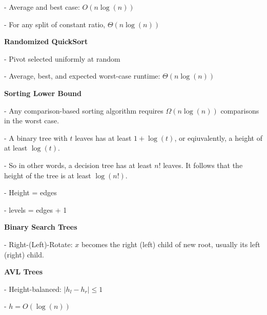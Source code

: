 \documentclass[8pt, letterpaper]{extarticle}
\begin{document}
\begin{minipage}[t]{0.45\textwidth}
- Average and best case: $O(n\log(n))$

- For any split of constant ratio, $\Theta(n\log(n))$

{\small \textbf{Randomized QuickSort}}

- Pivot selected uniformly at random

- Average, best, and expected worst-case runtime: $\Theta(n\log(n))$

\textbf{Sorting Lower Bound}

- Any comparison-based sorting algorithm requires $\Omega(n\log(n))$ comparisons in the worst case.

- A binary tree with $t$ leaves has at least $1 + \log(t)$, or eqiuvalently, a height of at least $\log(t)$.

- So in other words, a decision tree has at least $n!$ leaves. It follows that the height of the tree is at least $\log(n!)$.

- Height = edges

- levels = edges + 1

\textbf{Binary Search Trees}

- Right-(Left)-Rotate: $x$ becomes the right (left) child of new root, usually its left (right) child.

\textbf{AVL Trees}

- Height-balanced: $|h_l - h_r| \leq 1$

- $h = O(\log(n))$ 

\end{minipage}
\end{document}
